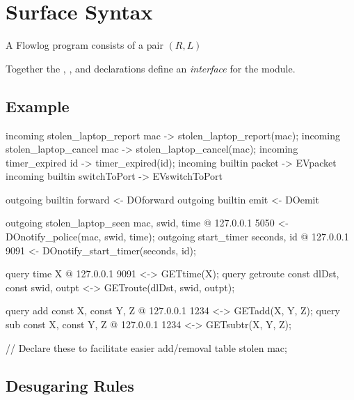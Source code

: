 

\section{Surface Syntax}

A Flowlog program consists of a pair $(R, L)$ 

Together the , , and 
declarations define an \emph{interface} for the module.

\subsection{Example}

\begin{flowlog}

  incoming stolen_laptop_report {mac} -> stolen_laptop_report(mac);
  incoming stolen_laptop_cancel {mac} -> stolen_laptop_cancel(mac);
  incoming timer_expired {id} -> timer_expired(id);
  incoming builtin packet -> EVpacket
  incoming builtin switchToPort -> EVswitchToPort

  outgoing builtin forward <- DOforward
  outgoing builtin emit <- DOemit
  
  outgoing stolen_laptop_seen {mac, swid, time} @ 127.0.0.1 5050 
    <- DOnotify_police(mac, swid, time);
  outgoing start_timer {seconds, id} @ 127.0.0.1 9091 
    <- DOnotify_start_timer(seconds, id);

  query time { X } @ 127.0.0.1 9091 <-> 
    GETtime(X); 
  query getroute {const dlDst, const swid, outpt} <-> 
    GETroute(dlDst, swid, outpt);

  query add {const X, const Y, Z} @ 127.0.0.1 1234 <-> 
    GETadd(X, Y, Z); 
  query sub {const X, const Y, Z} @ 127.0.0.1 1234 <-> 
    GETsubtr(X, Y, Z); 

  // Declare these to facilitate easier add/removal
  table stolen {mac};

\end{flowlog}





\subsection{Desugaring Rules}




